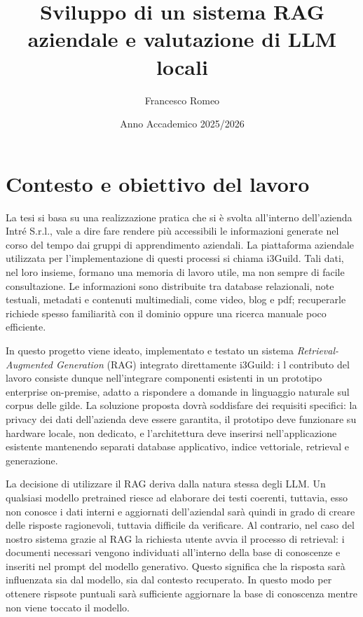 \documentclass[12pt,a4paper]{article}
\title{\textbf{Sviluppo di un sistema RAG aziendale e valutazione di LLM locali}}
\author{Francesco Romeo}
\date{Anno Accademico 2025/2026}
\begin{document}
\maketitle

\section*{Contesto e obiettivo del lavoro}

La tesi si basa su una realizzazione pratica che si è svolta all'interno dell'azienda Intré S.r.l., 
vale a dire fare rendere più accessibili le informazioni generate nel corso del tempo dai gruppi di apprendimento aziendali. 
La piattaforma aziendale utilizzata per l'implementazione di questi processi si chiama i3Guild. 
Tali dati, nel loro insieme, formano una memoria di lavoro utile, ma non sempre di facile
consultazione. Le informazioni sono distribuite tra database relazionali, note
testuali, metadati e contenuti multimediali, come video, blog e pdf; 
recuperarle richiede spesso familiarità con il dominio oppure una ricerca manuale poco efficiente.

In questo progetto viene ideato, implementato e testato un sistema
\textit{Retrieval-Augmented Generation} (RAG) integrato direttamente i3Guild: i
l contributo del lavoro consiste dunque nell'integrare componenti esistenti in un prototipo 
enterprise on-premise, adatto a rispondere a domande in linguaggio naturale sul 
corpus delle gilde. La soluzione proposta dovrà soddisfare dei requisiti specifici: 
la privacy dei dati dell'azienda deve essere garantita, il prototipo deve 
funzionare su hardware locale, non dedicato, e l'architettura deve inserirsi nell'applicazione 
esistente mantenendo separati database applicativo, indice vettoriale, retrieval e generazione.


La decisione di utilizzare il RAG deriva dalla natura stessa degli LLM. 
Un qualsiasi modello pretrained riesce ad elaborare dei testi 
coerenti, tuttavia, esso non conosce i dati interni e aggiornati dell'aziendal
sarà quindi in grado di creare delle risposte ragionevoli, tuttavia difficile da verificare. 
Al contrario, nel caso del nostro sistema grazie al RAG la richiesta utente avvia il 
processo di retrieval: i documenti necessari vengono individuati all'interno della 
base di conoscenze e inseriti nel prompt del modello generativo. Questo significa 
che la risposta sarà influenzata sia dal modello, sia dal contesto recuperato. 
In questo modo per ottenere rispsote puntuali sarà sufficiente
aggiornare la base di conoscenza mentre non viene toccato il modello.
\end{document}
